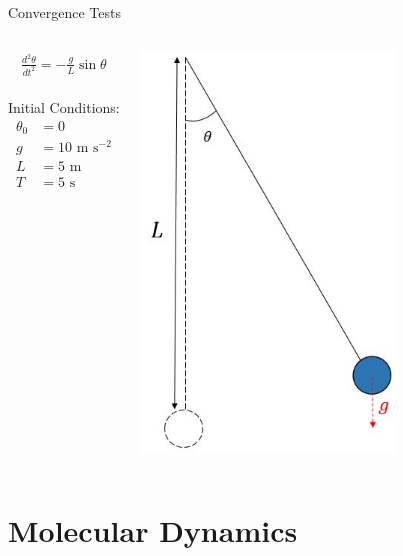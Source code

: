 \documentclass{beamer}
\begin{document}
\begin{frame}{Convergence Tests}
\begin{columns}
	\begin{align*}
		\frac{d^2\theta}{dt^2} = -\frac{g}{L}\sin\theta
	\end{align*} \\
	\bigskip
	Initial Conditions:
	\begin{align*}
	\theta_{0} &= 0 \\
	g &= 10 \mbox{ m s}^{-2} \\
	L &= 5 \mbox{ m} \\
	T &= 5 \mbox{ s}
	\end{align*}

	\centering
	\includegraphics[width=0.75\textwidth]{pendulum_diagram_4.jpg}
\end{columns}
\end{frame}

\section{Molecular Dynamics}
\end{document}
